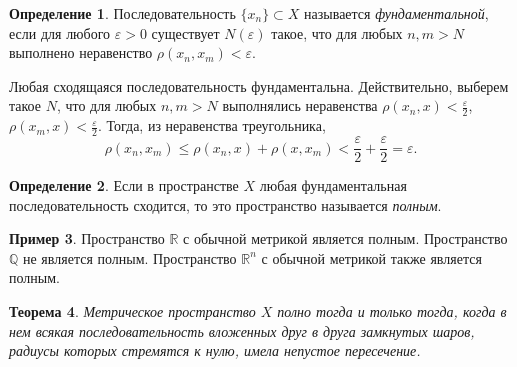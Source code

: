 \documentclass[12pt, titlepage, oneside]{amsbook}
\newcommand{\RR}{\mathbb{R}}
\newcommand{\QQ}{\mathbb{Q}}
\newtheorem{theorem}{Теорема}[chapter]
\theoremstyle{definition}
\newtheorem{example}[theorem]{Пример}
\newtheorem{definition}[theorem]{Определение}
\theoremstyle{remark}
\begin{document}
\begin{definition}
Последовательность $\{x_n\}\subset X$ называется \emph{фундаментальной}, если для любого $\varepsilon>0$ существует $N(\varepsilon)$ такое, что для любых $n,m>N$ выполнено неравенство $\rho(x_n,x_m)<\varepsilon$.
\end{definition}

Любая сходящаяся последовательность фундаментальна. Действительно, выберем такое $N$, что для любых $n,m>N$ выполнялись неравенства $\rho(x_n,x)<\frac{\varepsilon}{2}$, $\rho(x_m,x)<\frac{\varepsilon}{2}$. Тогда, из неравенства треугольника, $$\rho(x_n,x_m)\leq\rho(x_n,x)+\rho(x,x_m)<\frac{\varepsilon}{2}+\frac{\varepsilon}{2}=\varepsilon.$$

\begin{definition}
Если в пространстве $X$ любая фундаментальная последовательность сходится, то это пространство называется \emph{полным}.
\end{definition}

\begin{example}
Пространство $\RR$ с обычной метрикой является полным. Пространство $\QQ$ не является полным. Пространство $\RR^n$ с обычной метрикой также является полным.
\end{example}

 \begin{theorem}
\label{Pol2}
Метрическое пространство $X$ полно тогда и только тогда, когда в нем всякая последовательность вложенных друг в друга замкнутых шаров, радиусы которых стремятся к нулю, имела непустое пересечение.
\end{theorem}
\end{document}
